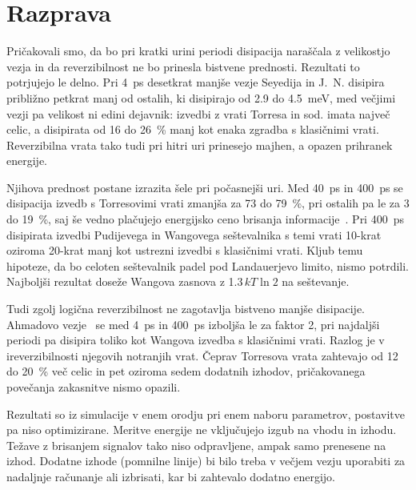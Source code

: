 

\section{Razprava}
\label{g19:sec:razprava}

Pričakovali smo, da bo pri kratki urini periodi disipacija naraščala z velikostjo vezja in da reverzibilnost ne bo prinesla bistvene prednosti. Rezultati to potrjujejo le delno. Pri \SI{4}{ps} desetkrat manjše vezje Seyedija in J.~N. disipira približno petkrat manj od ostalih, ki disipirajo od \num{2.9} do \SI{4.5}{\milli\electronvolt}, med večjimi vezji pa velikost ni edini dejavnik: izvedbi z vrati Torresa in sod. imata največ celic, a disipirata od \num{16} do \SI{26}{\percent} manj kot enaka zgradba s klasičnimi vrati. Reverzibilna vrata tako tudi pri hitri uri prinesejo majhen, a opazen prihranek energije.

Njihova prednost postane izrazita šele pri počasnejši uri. Med \SI{40}{ps} in \SI{400}{ps} se disipacija izvedb s Torresovimi vrati zmanjša za \num{73} do \SI{79}{\percent}, pri ostalih pa le za \num{3} do \SI{19}{\percent}, saj še vedno plačujejo energijsko ceno brisanja informacije~\cite{landauer1961,g19:torres2019}. Pri \SI{400}{ps} disipirata izvedbi Pudijevega in Wangovega seštevalnika s temi vrati \num{10}-krat oziroma \num{20}-krat manj kot ustrezni izvedbi s klasičnimi vrati. Kljub temu hipoteze, da bo celoten seštevalnik padel pod Landauerjevo limito, nismo potrdili. Najboljši rezultat doseže Wangova zasnova z \num{1.3}\,$kT\ln 2$ na seštevanje.

Tudi zgolj logična reverzibilnost ne zagotavlja bistveno manjše disipacije. Ahmadovo vezje~\cite{g19:ahmad2018} se med \SI{4}{ps} in \SI{400}{ps} izboljša le za faktor \num{2}, pri najdaljši periodi pa disipira toliko kot Wangova izvedba s klasičnimi vrati. Razlog je v ireverzibilnosti njegovih notranjih vrat. Čeprav Torresova vrata zahtevajo od \num{12} do \SI{20}{\percent} več celic in pet oziroma sedem dodatnih izhodov, pričakovanega povečanja zakasnitve nismo opazili.

Rezultati so iz simulacije v enem orodju pri enem naboru parametrov, postavitve pa niso optimizirane. Meritve energije ne vključujejo izgub na vhodu in izhodu. Težave z brisanjem signalov tako niso odpravljene, ampak samo prenesene na izhod. Dodatne izhode (pomnilne linije) bi bilo treba v večjem vezju uporabiti za nadaljnje računanje ali izbrisati, kar bi zahtevalo dodatno energijo.


